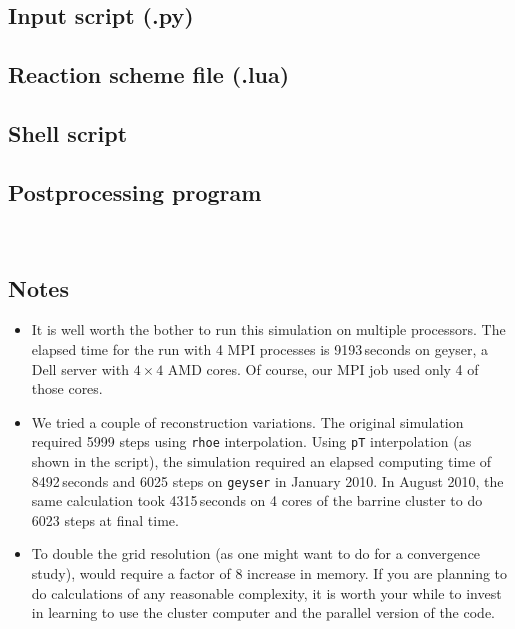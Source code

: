 \clearpage

\subsection{Input script (.py)}
\label{finite-cyl-script}
\topbar

\bottombar

\subsection{Reaction scheme file (.lua)}
\topbar

\bottombar

\pagebreak
\subsection{Shell script}
\label{finite-cyl-sh-files}
\topbar

\bottombar


\subsection{Postprocessing program}
\label{finite-cyl-post-files}
\topbar

\bottombar\\
\topbar

\bottombar

\subsection{Notes}
\begin{itemize}
\item It is well worth the bother to run this simulation on multiple processors. 
  The elapsed time for the run with 4 MPI processes is 9193\,seconds on geyser,
  a Dell server with $4\times4$ AMD cores.
  Of course, our MPI job used only 4 of those cores.
\item We tried a couple of reconstruction variations.  
  The original simulation required 5999 steps using \texttt{rhoe} interpolation.
  Using \texttt{pT} interpolation (as shown in the script), the simulation required 
  an elapsed computing time of 8492\,seconds and 6025 steps on \texttt{geyser} in January 2010.
  In August 2010, the same calculation took 4315\,seconds on 4 cores of the barrine cluster 
  to do 6023 steps at final time.
\item To double the grid resolution (as one might want to do for a convergence
  study), would require a factor of 8 increase in memory.
  If you are planning to do calculations of any reasonable complexity, it is
  worth your while to invest in learning to use the cluster computer and
  the parallel version of the code.

\end{itemize}
